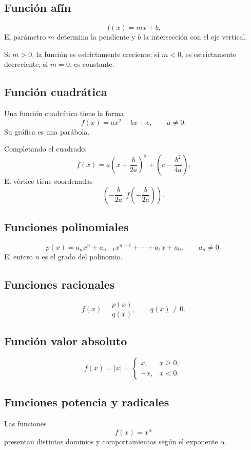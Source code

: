 \documentclass[12pt]{article}
\theoremstyle{remark}
\begin{document}
\subsection*{Función afín}

\[
f(x)=mx+b.
\]
El parámetro $m$ determina la pendiente y $b$ la intersección con el eje
vertical.

Si $m>0$, la función es estrictamente creciente; si $m<0$, es estrictamente
decreciente; si $m=0$, es constante.

\subsection*{Función cuadrática}

Una función cuadrática tiene la forma
\[
f(x)=ax^2+bx+c,\qquad a\neq0.
\]
Su gráfica es una parábola.

Completando el cuadrado:
\[
f(x)
=a\left(x+\frac{b}{2a}\right)^2
+\left(c-\frac{b^2}{4a}\right).
\]
El vértice tiene coordenadas
\[
\left(
-\frac{b}{2a},
f\left(-\frac{b}{2a}\right)
\right).
\]

\subsection*{Funciones polinomiales}

\[
p(x)=a_nx^n+a_{n-1}x^{n-1}+\cdots+a_1x+a_0,
\qquad a_n\neq0.
\]
El entero $n$ es el grado del polinomio.

\subsection*{Funciones racionales}

\[
f(x)=\frac{p(x)}{q(x)},\qquad q(x)\neq0.
\]

\subsection*{Función valor absoluto}

\[
f(x)=|x|=
\begin{cases}
x,&x\geq0,\\
-x,&x<0.
\end{cases}
\]

\subsection*{Funciones potencia y radicales}

Las funciones
\[
f(x)=x^\alpha
\]
presentan distintos dominios y comportamientos según el exponente $\alpha$.
\end{document}
